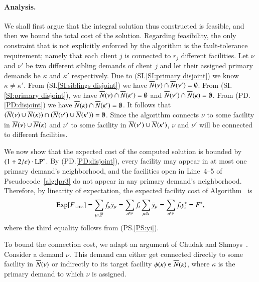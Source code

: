 
\paragraph{Analysis.}
We shall first argue that the integral solution thus
constructed is feasible, and then we bound the total cost of
the solution. Regarding feasibility, the only constraint
that is not explicitly enforced by the algorithm is the
fault-tolerance requirement; namely that each client $j$ is
connected to $r_j$ different facilities. Let $\nu$ and
$\nu'$ be two different sibling demands of client $j$ and let
their assigned primary demands be $\kappa$ and $\kappa'$
respectively. Due to (SI.\ref{SI:primary
  disjoint}) we know $\kappa \neq \kappa'$. From
(SI.\ref{SI:siblings disjoint}) we have ${\overline{N}}(\nu) \cap
{\overline{N}}(\nu') = \emptyset$. From (SI.\ref{SI:primary
  disjoint}), we have ${\overline{N}}(\nu) \cap {\overline{N}}(\kappa') =
\emptyset$ and ${\overline{N}}(\nu') \cap {\overline{N}}(\kappa) =
\emptyset$. From (PD.\ref{PD:disjoint}) we have
${\overline{N}}(\kappa)\cap {\overline{N}}(\kappa') = \emptyset$. It follows
that $({\overline{N}}(\nu) \cup {\overline{N}}(\kappa)) \cap ({\overline{N}}(\nu')
\cup {\overline{N}}(\kappa')) = \emptyset$. Since the algorithm
connects $\nu$ to some facility in ${\overline{N}}(\nu) \cup
{\overline{N}}(\kappa)$ and $\nu'$ to some facility in ${\overline{N}}(\nu')
\cup {\overline{N}}(\kappa')$, $\nu$ and $\nu'$ will be connected to
different facilities.



\smallskip
We now show that the expected cost of the computed solution is bounded by
$(1+2/e) \cdot \mbox{\rm LP}^\ast$. By
(PD.\ref{PD:disjoint}), every facility may appear in at
most one primary demand's neighborhood, and the facilities
open in Line~4--5 of Pseudocode~\ref{alg:lpr3} do not appear
in any primary demand's neighborhood. Therefore, by
linearity of expectation, the expected facility cost of
Algorithm~{\ECHS} is 
%
\begin{equation*}
\mbox{\rm Exp}[F_{\mbox{\tiny\rm ECHS}}] 
	= \sum_{\mu\in\overline{\mathbb{F}}} f_\mu {\bar y}_{\mu} 
	= \sum_{i\in\mathbb{F}} f_i\sum_{\mu\in i} {\bar y}_{\mu} 
	= \sum_{i\in\mathbb{F}} f_i y_i^\ast = F^\ast,
\end{equation*}
%
where the third equality follows from (PS.\ref{PS:yi}).

\smallskip

To bound the connection cost, we adapt an argument of Chudak
and Shmoys~\cite{ChudakS04}. Consider a demand $\nu$. This
demand can either get connected directly to some facility in
${\overline{N}}(\nu)$ or indirectly to its target facility $\phi(\kappa)\in
{\overline{N}}(\kappa)$, where $\kappa$ is the primary demand to
which $\nu$ is assigned.

